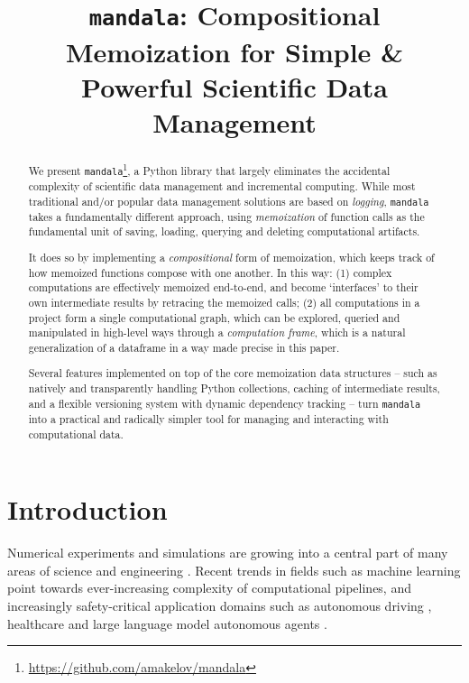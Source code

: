 \documentclass{article} %
\title{\texttt{mandala}: Compositional Memoization for Simple \&
Powerful Scientific Data Management}
\begin{document}
\maketitle


\begin{abstract}
  We present
  \texttt{mandala}\footnote{\url{https://github.com/amakelov/mandala}}, a Python
  library that largely eliminates the accidental complexity of scientific data
  management and incremental computing. While most traditional and/or
  popular data management solutions are based on \emph{logging},
  \texttt{mandala} takes a fundamentally different approach, using
  \emph{memoization} of function calls as the fundamental unit of saving,
  loading, querying and deleting computational artifacts. 
  
  It does so by implementing a \emph{compositional} form of memoization, which keeps
  track of how memoized functions compose with one another. In this way: (1)
  complex computations are effectively memoized end-to-end, and become
  `interfaces' to their own intermediate results by retracing the memoized
  calls; (2) all computations in a project form a single computational graph,
  which can be explored, queried and manipulated in high-level ways through a
  \emph{computation frame}, which is a natural generalization of a dataframe in
  a way made precise in this paper. 

  Several features implemented on top of the core memoization data structures --
  such as natively and transparently handling Python collections, caching of
  intermediate results, and a flexible versioning system with dynamic dependency
  tracking -- turn \texttt{mandala} into a practical and radically simpler tool
  for managing and interacting with computational data.
\end{abstract}

\section{Introduction}
\label{section:}

Numerical experiments and simulations are growing into a central part of many
areas of science and engineering \citep{hey2009fourth}. Recent trends in
fields such as machine learning point towards ever-increasing complexity of
computational pipelines, and increasingly safety-critical application domains
such as autonomous driving \citep{bojarski2016end}, healthcare
\citep{ravi2016deep,abramson2024accurate} and large language model autonomous
agents \citep{yang2024swe}.
\end{document}
